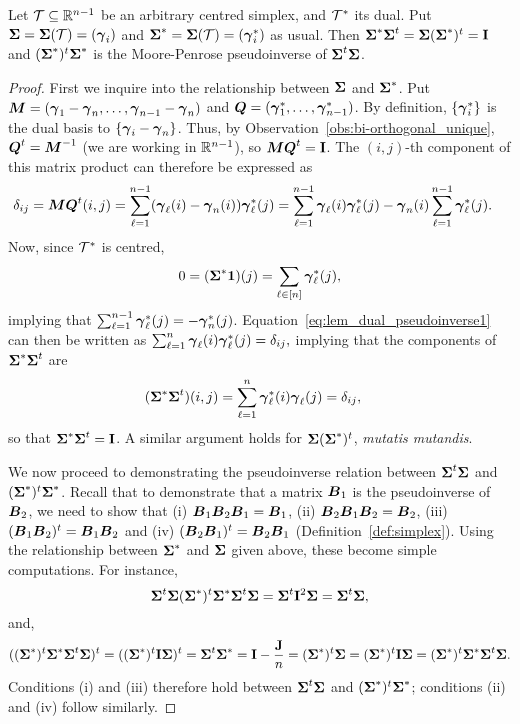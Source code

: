 \begin{lemma}
	\label{lem:dual_pseudoinverse}
	Let $\mathcal{T}\subseteq\mathbb{R}^{n-1}$ be an arbitrary centred  simplex, and $\mathcal{T}^*$ its dual. Put $\boldsymbol{\Sigma}=\boldsymbol{\Sigma}(\mathcal{T})=(\vb*{\gamma}_i)$ and $\boldsymbol{\Sigma}^*=\boldsymbol{\Sigma}(\mathcal{T})=(\vb*{\gamma}_i^*)$ as usual. Then $\boldsymbol{\Sigma}^*\boldsymbol{\Sigma}^t = \boldsymbol{\Sigma}(\boldsymbol{\Sigma}^*)^t=\vb{I}$ and $(\boldsymbol{\Sigma}^*)^t\boldsymbol{\Sigma}^*$ is the Moore-Penrose pseudoinverse of $\boldsymbol{\Sigma}^t\boldsymbol{\Sigma}$. 
\end{lemma}
\begin{proof}
	First we inquire into the relationship between $\boldsymbol{\Sigma}$ and $\boldsymbol{\Sigma}^*$. Put ${\vb*{M}}=(\vb*{\gamma}_1-\vb*{\gamma}_n,\dots,\vb*{\gamma}_{n-1}-\vb*{\gamma}_n)$ and $\vb*{Q} = (\vb*{\gamma}^*_1,\dots,\vb*{\gamma}_{n-1}^*)$. By definition, $\{\vb*{\gamma}_i^*\}$ is the dual  basis to $\{\vb*{\gamma}_i-\vb*{\gamma}_n\}$. Thus, by Observation~\ref{obs:bi-orthogonal_unique}, $\vb*{Q}^t={\vb*{M}}^{-1}$ (we are working in $\mathbb{R}^{n-1}$), so  ${\vb*{M}}\vb*{Q}^t=\vb{I}$. The $(i,j)$-th component of this matrix product can therefore be expressed as 
	\begin{align}
	\delta_{ij} = {\vb*{M}}\vb*{Q}^t(i,j) &= \sum_{\ell=1}^{n-1} (\vb*{\gamma}_\ell(i) - \vb*{\gamma}_n(i))\vb*{\gamma}_\ell^*(j) = \sum_{\ell=1}^{n-1} \vb*{\gamma}_\ell(i)\vb*{\gamma}^*_\ell(j) - \vb*{\gamma}_n(i)\sum_{\ell=1}^{n-1}\vb*{\gamma}^*_\ell(j).\label{eq:lem_dual_pseudoinverse1}
	\end{align}
	Now,  since $\mathcal{T}^*$ is centred, 
	\begin{equation*}
	0=	(\boldsymbol{\Sigma}^*\vb{1})(j) = \sum_{\ell\in[n]} \vb*{\gamma}_\ell^*(j),
	\end{equation*}
	implying that $\sum_{\ell=1}^{n-1}\vb*{\gamma}_\ell^*(j) = - \vb*{\gamma}_n^*(j)$. Equation~\eqref{eq:lem_dual_pseudoinverse1} can then be written as 
	$
	\sum_{\ell=1}^{n} \vb*{\gamma}_\ell(i)\vb*{\gamma}_\ell^*(j)=\delta_{ij},
	$
	implying that the components of $\boldsymbol{\Sigma}^*\boldsymbol{\Sigma}^t$ are
	\begin{align*}
	(\boldsymbol{\Sigma}^*\boldsymbol{\Sigma}^t)(i,j) &= \sum_{\ell=1}^n \vb*{\gamma}_\ell^*(i)\vb*{\gamma}_\ell(j)=\delta_{ij},
	\end{align*}
	so that $\boldsymbol{\Sigma}^*\boldsymbol{\Sigma}^t=\vb{I}$. A similar argument  holds for $\boldsymbol{\Sigma}(\boldsymbol{\Sigma}^*)^t$, \emph{mutatis mutandis}.  
	
	We now proceed to demonstrating the pseudoinverse relation between $\boldsymbol{\Sigma}^t\boldsymbol{\Sigma}$ and $(\boldsymbol{\Sigma}^*)^t\boldsymbol{\Sigma}^*$. Recall that to demonstrate that  a matrix $\vb*{B}_1$ is the pseudoinverse of $\vb*{B}_2$, we need  to show that (i) $\vb*{B}_1\vb*{B}_2\vb*{B}_1=\vb*{B}_1$, (ii) $\vb*{B}_2\vb*{B}_1\vb*{B}_2=\vb*{B}_2$, (iii) $(\vb*{B}_1\vb*{B}_2)^t = \vb*{B}_1\vb*{B}_2$ and  (iv)  $(\vb*{B}_2\vb*{B}_1)^t = \vb*{B}_2\vb*{B}_1$ (Definition~\ref{def:simplex}). Using the relationship between  $\boldsymbol{\Sigma}^*$ and  $\boldsymbol{\Sigma}$ given above, these become simple computations. For instance, 
	\begin{equation*}
	\boldsymbol{\Sigma}^t\boldsymbol{\Sigma}(\boldsymbol{\Sigma}^*)^t\boldsymbol{\Sigma}^*\boldsymbol{\Sigma}^t\boldsymbol{\Sigma} = \boldsymbol{\Sigma}^t \vb{I}^2 \boldsymbol{\Sigma}=\boldsymbol{\Sigma}^t\boldsymbol{\Sigma},
	\end{equation*}
	and, 
	\begin{align*}
	((\boldsymbol{\Sigma}^*)^t\boldsymbol{\Sigma}^* \boldsymbol{\Sigma}^t\boldsymbol{\Sigma})^t = ((\boldsymbol{\Sigma}^*)^t\vb{I}\boldsymbol{\Sigma})^t = \boldsymbol{\Sigma}^t\boldsymbol{\Sigma}^* = \vb{I}-\frac{\vb{J}}{n} = (\boldsymbol{\Sigma}^*)^t\boldsymbol{\Sigma} = (\boldsymbol{\Sigma}^*)^t\vb{I}\boldsymbol{\Sigma} = (\boldsymbol{\Sigma}^*)^t\boldsymbol{\Sigma}^*\boldsymbol{\Sigma}^t\boldsymbol{\Sigma}.
	\end{align*} 
	Conditions (i) and (iii) therefore  hold between $\boldsymbol{\Sigma}^t\boldsymbol{\Sigma}$ and  $(\boldsymbol{\Sigma}^*)^t\boldsymbol{\Sigma}^*$; conditions (ii) and (iv) follow similarly. 
\end{proof}


